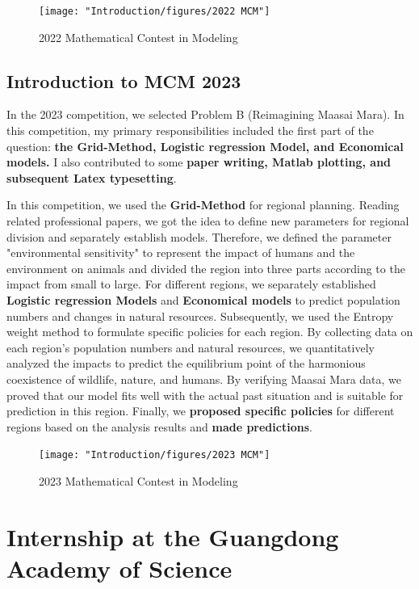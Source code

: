 \begin{figure}[H]
	\centering
	\texttt{[image: "Introduction/figures/2022 MCM"]}
	\caption{2022 Mathematical Contest in Modeling}
	\label{fig:2022-mcm}
\end{figure}

\subsection{Introduction to MCM 2023}
In the 2023 competition, we selected Problem B (Reimagining Maasai Mara). In this competition, my primary responsibilities included the first part of the question: \textbf{the Grid-Method, Logistic regression Model, and Economical models.} I also contributed to some \textbf{paper writing, Matlab plotting, and subsequent Latex typesetting}.

In this competition, we used the \textbf{Grid-Method} for regional planning. Reading related professional papers, we got the idea to define new parameters for regional division and separately establish models. Therefore, we defined the parameter "environmental sensitivity" to represent the impact of humans and the environment on animals and divided the region into three parts according to the impact from small to large. For different regions, we separately established \textbf{Logistic regression Models} and \textbf{Economical models} to predict population numbers and changes in natural resources. Subsequently, we used the Entropy weight method to formulate specific policies for each region. By collecting data on each region's population numbers and natural resources, we quantitatively analyzed the impacts to predict the equilibrium point of the harmonious coexistence of wildlife, nature, and humans. By verifying Maasai Mara data, we proved that our model fits well with the actual past situation and is suitable for prediction in this region. Finally, we \textbf{proposed specific policies} for different regions based on the analysis results and \textbf{made predictions}.

\begin{figure}[htp]
	\centering
	\texttt{[image: "Introduction/figures/2023 MCM"]}
	\caption{2023 Mathematical Contest in Modeling}
	\label{fig:2023-mcm}
\end{figure}

\section{Internship at the Guangdong Academy of Science}

